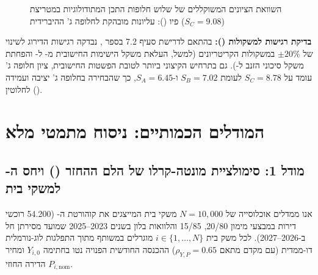 \begin{figure}[htbp]
\centering
\begin{english}
\end{english}
\caption{השוואת הציונים המשוקללים של שלוש חלופות התכן המתודולוגיות במטריצת פיו (): עליונות מובהקת לחלופה ג' ההיברידית ($S_C = 9.08$) \cite{segal2026prep,pugh1991total}}
\label{fig:pugh_scores_chart}
\end{figure}

\textbf{בדיקת רגישות למשקולות ():} בהתאם לדרישת סעיף \num{7.2} בספר \cite{segal2026prep}, נבדקה רגישות הדירוג לשינוי של $\pm20\%$ במשקולות הקריטריונים (למשל, העלאת משקל הישימות החישובית מ- ל- והפחתת משקל סיכוני הזנב ל-). גם בתרחיש הקיצוני ביותר לטובת הפשטות החישובית, ציון חלופה ג' עומד על $S_C = 8.78$ לעומת $S_B = 7.02$ ו-$S_A = 6.45$, כך שהבחירה בחלופה ג' יציבה ועמידה לחלוטין ().

\section{המודלים הכמותיים: ניסוח מתמטי מלא}
\label{sec:quantitative_models}

\subsection{מודל 1: סימולציית מונטה-קרלו של הלם ההחזר () ויחס ה- למשקי בית}
אנו ממדלים אוכלוסייה של $N = 10,000$ משקי בית המייצגים את קוהורטת ה- (\num{54,200} רוכשי דירות במבצעי מימון \num{20/80}, \num{15/85} והלוואות בלון בשנים \num{2023}--\num{2025} שמועד מסירתן חל ב-\num{2026}--\num{2027}). לכל משק בית $i \in \{1,\dots,N\}$ מוגרלים במשותף מתוך התפלגות לוג-נורמלית דו-ממדית (עם מקדם מתאם $\rho_{Y,P} = 0.65$) ההכנסה החודשית הפנויה נטו בחתימה $Y_{i,0}$ ומחיר הדירה החוזי $P_{i,\text{nom}}$.

